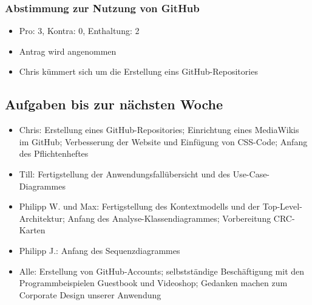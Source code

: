 \documentclass[12pt,a4paper]{article}
\begin{document}
\subsubsection*{Abstimmung zur Nutzung von GitHub}
\begin{itemize}
\item Pro: 3, Kontra: 0, Enthaltung: 2
\item Antrag wird angenommen
\item Chris kümmert sich um die Erstellung eins GitHub-Repositories
\end{itemize}

\subsection*{Aufgaben bis zur nächsten Woche}
\medskip
\begin{itemize}
\item Chris: Erstellung eines GitHub-Repositories; Einrichtung eines MediaWikis im GitHub; Verbesserung der Website und Einfügung von CSS-Code; Anfang des Pflichtenheftes
\item Till: Fertigstellung der Anwendungsfallübersicht und des Use-Case-Diagrammes
\item Philipp W. und Max: Fertigstellung des Kontextmodells und der Top-Level-Architektur; Anfang des Analyse-Klassendiagrammes; Vorbereitung CRC-Karten
\item Philipp J.: Anfang des Sequenzdiagrammes
\item Alle: Erstellung von GitHub-Accounts; selbstständige Beschäftigung mit den Programmbeispielen Guestbook und Videoshop; Gedanken machen zum Corporate Design unserer Anwendung
\end{itemize}
\end{document}
